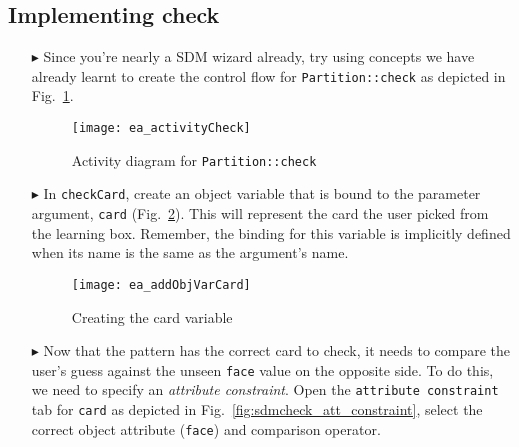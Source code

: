 \newpage
\hypertarget{checkCard vis}{}
\subsection{Implementing check}
\visHeader

\begin{itemize}

\vspace{1cm}

\item[$\blacktriangleright$] Since you're nearly a SDM wizard already, try using concepts we have already learnt to create the control flow for
\texttt{Partition::check} as depicted in Fig.~\ref{fig:sdm_check_start}.

\vspace{1cm}

\begin{figure}[htbp]
\begin{center}
  \texttt{[image: ea\_activityCheck]}
  \caption{Activity diagram for \texttt{Partition::check}}
  \label{fig:sdm_check_start}
\end{center}
\end{figure}

\vspace{1cm}

\item[$\blacktriangleright$] In \texttt{checkCard}, create an object variable that is bound to the parameter argument, \texttt{card} 
(Fig.~\ref{fig:sdm_check_addCard}). This will represent the card the user picked from the learning box. Remember, the binding for this variable is implicitly
defined when its name is the same as the argument's name.

\begin{figure}[htbp]
\begin{center}
  \texttt{[image: ea\_addObjVarCard]}
  \caption{Creating the card variable}
  \label{fig:sdm_check_addCard}
\end{center}
\end{figure}

\clearpage

\item[$\blacktriangleright$] Now that the pattern has the correct card to check, it needs to compare the user's guess against the unseen \texttt{face} value on
the opposite side. To do this, we need to specify an \emph{attribute constraint}. Open the \texttt{attribute constraint} tab for \texttt{card} as depicted in
Fig.~\ref{fig:sdmcheck_att_constraint}, select the correct object attribute (\texttt{face}) and comparison operator.


\end{itemize}
